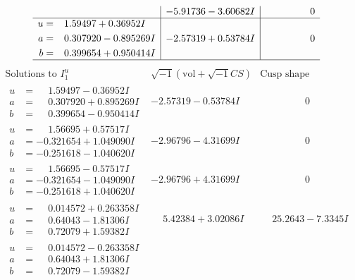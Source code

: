 \documentclass[1p]{elsarticle_modified}
\theoremstyle{definition}
\newcommand{\I}{\sqrt{-1}}
\begin{document}
$$\begin{array}{c|c|c}
 & -5.91736 - 3.60682 I & \phantom{-0.000000 } 0 \\ \hline\begin{aligned}
u &= \phantom{-}1.59497 + 0.36952 I \\
a &= \phantom{-}0.307920 - 0.895269 I \\
b &= \phantom{-}0.399654 + 0.950414 I\end{aligned}
 & -2.57319 + 0.53784 I & \phantom{-0.000000 } 0\\
 \hline 
 \end{array}$$\newpage$$\begin{array}{c|c|c}  
\text{Solutions to }I^u_{1}& \I (\text{vol} + \sqrt{-1}CS) & \text{Cusp shape}\\
 \hline 
\begin{aligned}
u &= \phantom{-}1.59497 - 0.36952 I \\
a &= \phantom{-}0.307920 + 0.895269 I \\
b &= \phantom{-}0.399654 - 0.950414 I\end{aligned}
 & -2.57319 - 0.53784 I & \phantom{-0.000000 } 0 \\ \hline\begin{aligned}
u &= \phantom{-}1.56695 + 0.57517 I \\
a &= -0.321654 + 1.049090 I \\
b &= -0.251618 - 1.040620 I\end{aligned}
 & -2.96796 - 4.31699 I & \phantom{-0.000000 } 0 \\ \hline\begin{aligned}
u &= \phantom{-}1.56695 - 0.57517 I \\
a &= -0.321654 - 1.049090 I \\
b &= -0.251618 + 1.040620 I\end{aligned}
 & -2.96796 + 4.31699 I & \phantom{-0.000000 } 0 \\ \hline\begin{aligned}
u &= \phantom{-}0.014572 + 0.263358 I \\
a &= \phantom{-}0.64043 - 1.81306 I \\
b &= \phantom{-}0.72079 + 1.59382 I\end{aligned}
 & \phantom{-}5.42384 + 3.02086 I & \phantom{-}25.2643 - 7.3345 I \\ \hline\begin{aligned}
u &= \phantom{-}0.014572 - 0.263358 I \\
a &= \phantom{-}0.64043 + 1.81306 I \\
b &= \phantom{-}0.72079 - 1.59382 I\end{aligned}

\end{array}$$
\end{document}
